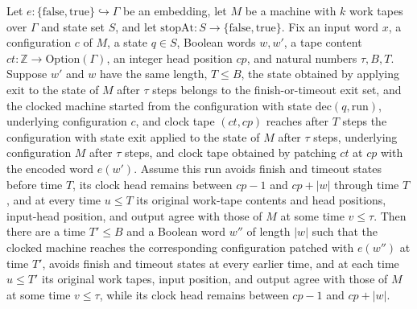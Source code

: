 \begin{theorem}
\label{Turing.sc_deliver}
\leanok
{}
Let $e:\{\mathrm{false},\mathrm{true}\}\hookrightarrow\Gamma$ be an embedding, let $M$
be a machine with $k$ work tapes over $\Gamma$ and state set $S$, and let
$\mathrm{stopAt}:S\to\{\mathrm{false},\mathrm{true}\}$. Fix an input word $x$, a
configuration $c$ of $M$, a state $q\in S$, Boolean words $w,w'$, a tape content
$ct:\mathbb Z\to\mathrm{Option}(\Gamma)$, an integer head position $cp$, and natural
numbers $\tau,B,T$. Suppose $w'$ and $w$ have the same length, $T\le B$, the state
obtained by applying $\mathrm{exit}$ to the state of $M$ after $\tau$ steps belongs to
the finish-or-timeout exit set, and the clocked machine started from the configuration
with state $\mathrm{dec}(q,\mathrm{run})$, underlying configuration $c$, and clock tape
$(ct,cp)$ reaches after $T$ steps the configuration with state $\mathrm{exit}$ applied
to the state of $M$ after $\tau$ steps, underlying configuration $M$ after $\tau$ steps,
and clock tape obtained by patching $ct$ at $cp$ with the encoded word $e(w')$. Assume
this run avoids finish and timeout states before time $T$, its clock head remains
between $cp-1$ and $cp+|w|$ through time $T$, and at every time $u\le T$ its original
work-tape contents and head positions, input-head position, and output agree with those
of $M$ at some time $v\le\tau$. Then there are a time $T'\le B$ and a Boolean word $w''$
of length $|w|$ such that the clocked machine reaches the corresponding configuration
patched with $e(w'')$ at time $T'$, avoids finish and timeout states at every earlier
time, and at each time $u\le T'$ its original work tapes, input position, and output
agree with those of $M$ at some time $v\le\tau$, while its clock head remains between
$cp-1$ and $cp+|w|$.
\end{theorem}


